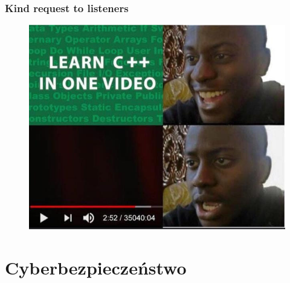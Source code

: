 \documentclass[10pt,t]{beamer}
\begin{document}
\begin{frame}
  \frametitle{Kind request to listeners}


  \begin{figure}

    \centering


    \includegraphics[scale=0.4]
    {./PresentationsPictures/Learning-Cpp.jpg}

  \end{figure}

\end{frame}









\section{Cyberbezpieczeństwo}
\end{document}
